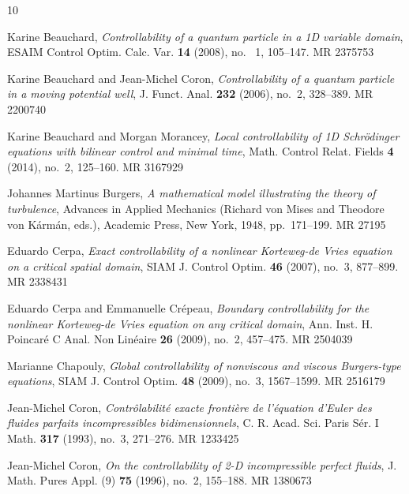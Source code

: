 \documentclass[11pt, reqno]{amsart}
\theoremstyle{plain}
\numberwithin{equation}{section}
\begin{document}
\providecommand{\bysame}{\leavevmode\hbox to3em{\hrulefill}\thinspace}
\providecommand{\MR}{\relax\ifhmode\unskip\space\fi MR }
\providecommand{\MRhref}[2]{%
  \href{http://www.ams.org/mathscinet-getitem?mr=#1}{#2}
}
\providecommand{\href}[2]{#2}
\begin{thebibliography}{10}


Karine Beauchard, \emph{Controllability of a quantum particle in a 1D variable domain}, ESAIM Control Optim. Calc. Var. \textbf{14} (2008), no. ~1, 105–147.  
 \MR{2375753} 


Karine Beauchard and Jean-Michel Coron, \emph{Controllability of a quantum particle in a moving potential well}, J. Funct. Anal. \textbf{232} (2006), no.~2, 328–389. \MR{2200740} 

Karine Beauchard and Morgan Morancey, \emph{Local controllability of 1{D}
  {S}chr\"{o}dinger equations with bilinear control and minimal time}, Math.
  Control Relat. Fields \textbf{4} (2014), no.~2, 125--160. \MR{3167929}

Johannes Martinus Burgers, \emph{A mathematical model illustrating the theory
  of turbulence}, Advances in {A}pplied {M}echanics (Richard von Mises and
  Theodore von K\'arm\'an, eds.), Academic Press, New York, 1948, pp.~171--199.
  \MR{27195}

Eduardo Cerpa, \emph{Exact controllability of a nonlinear {K}orteweg-de {V}ries
  equation on a critical spatial domain}, SIAM J. Control Optim. \textbf{46}
  (2007), no.~3, 877--899. \MR{2338431}

Eduardo Cerpa and Emmanuelle Cr\'{e}peau, \emph{Boundary controllability for the nonlinear Korteweg-de Vries equation on any critical domain}, Ann. Inst. H. Poincaré C Anal. Non Linéaire \textbf{26} (2009), no.~2, 457--475. \MR{2504039}


Marianne Chapouly, \emph{Global controllability of nonviscous and viscous
  {B}urgers-type equations}, SIAM J. Control Optim. \textbf{48} (2009), no.~3,
  1567--1599. \MR{2516179}

Jean-Michel Coron, \emph{Contr\^olabilit\'e{} exacte fronti\`ere de
  l'\'equation d'{E}uler des fluides parfaits incompressibles bidimensionnels},
  C. R. Acad. Sci. Paris S\'er. I Math. \textbf{317} (1993), no.~3, 271--276.
  \MR{1233425}

Jean-Michel Coron, \emph{On the controllability of 2-D incompressible perfect fluids},
 J. Math. Pures Appl. (9) \textbf{75} (1996), no.~2, 155–188. \MR{1380673}


\end{thebibliography}
\end{document}
